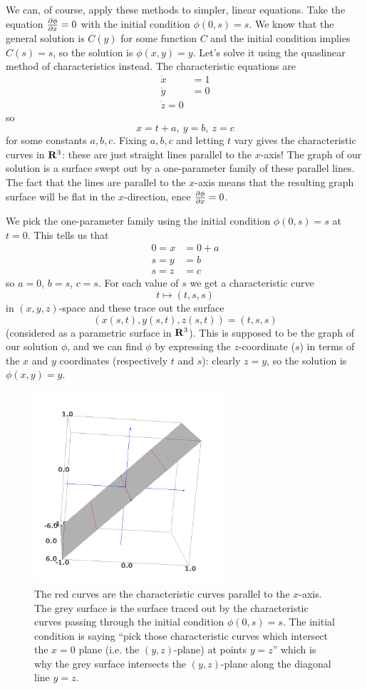We can, of course, apply these methods to simpler, linear equations. Take the equation $\frac{\partial \phi}{\partial x}=0$ with the initial condition $\phi(0,s)=s$. We know that the general solution is $C(y)$ for some function $C$ and the initial condition implies $C(s)=s$, so the solution is $\phi(x,y)=y$. Let's solve it using the quaslinear method of characteristics instead. The characteristic equations are
\begin{align*}
\dot{x}&=1\\
\dot{y}&=0\\
\dot{z}=0
\end{align*}
so
\[x=t+a,\ y=b,\ z=c\]
for some constants $a,b,c$. Fixing $a,b,c$ and letting $t$ vary gives the characteristic curves in $\mathbf{R}^3$: these are just straight lines parallel to the $x$-axis! The graph of our solution is a surface swept out by a one-parameter family of these parallel lines. The fact that the lines are parallel to the $x$-axis means that the resulting graph surface will be flat in the $x$-direction, ence $\frac{\partial \phi}{\partial x}=0$.

We pick the one-parameter family using the initial condition $\phi(0,s)=s$ at $t=0$. This tells us that
\begin{align*}
0=x&=0+a\\
s=y&=b\\
s=z&=c
\end{align*}
so $a=0$, $b=s$, $c=s$. For each value of $s$ we get a characteristic curve
\[t\mapsto (t,s,s)\]
in $(x,y,z)$-space and these trace out the surface
\[(x(s,t),y(s,t),z(s,t))=(t,s,s)\]
(considered as a parametric surface in $\mathbf{R}^3$). This is supposed to be the graph of our solution $\phi$, and we can find $\phi$ by expressing the $z$-coordinate ($s$) in terms of the $x$ and $y$ coordinates (respectively $t$ and $s$): clearly $z=y$, so the solution is $\phi(x,y)=y$.

\begin{figure}
\begin{center}\includegraphics[width=200pt]{qcharacteristic6.png}\end{center}
\caption{The red curves are the characteristic curves parallel to the $x$-axis. The grey surface is the surface traced out by the characteristic curves passing through the initial condition $\phi(0,s)=s$. The initial condition is saying ``pick those characteristic curves which intersect the $x=0$ plane (i.e. the $(y,z)$-plane) at points $y=z$'' which is why the grey surface intersects the $(y,z)$-plane along the diagonal line $y=z$.}
\end{figure}

